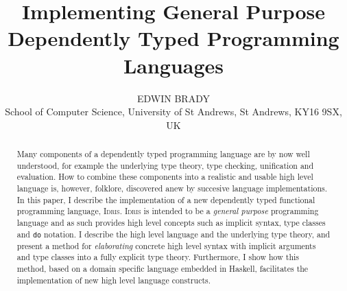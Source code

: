 \documentclass{jfp1}
\title
  {Implementing General Purpose Dependently Typed Programming Languages}
\author[Edwin Brady]
{EDWIN BRADY\\
School of Computer Science, University of St Andrews, St Andrews,
KY16 9SX, UK}
\newcounter{per}
\newcommand{\Idris}{\textsc{Idris}}
\begin{document}
\maketitle

\begin{abstract}
Many components of a dependently typed programming language are by now well
understood, for example the underlying type theory, type checking, unification and
evaluation.  How to combine these components into a realistic and usable high
level language is, however, folklore, discovered anew by succesive
language implementations.  In this paper, I describe the implementation of a
new dependently typed functional programming language, \Idris{}.
\Idris{} is intended to be a \emph{general purpose} programming language
and as such provides high level concepts such as implicit syntax, 
type classes and \texttt{do} notation. 
I describe the high level language and the underlying type theory, and present
a method for \emph{elaborating} concrete high level syntax with implicit
arguments and type classes into a fully explicit type theory. Furthermore,
I show how this method,
based on a domain specific language embedded in Haskell, facilitates the
implementation of new high level language constructs.

\end{abstract}






%
\end{document}

